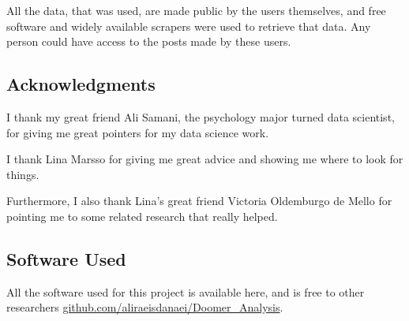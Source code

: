 \documentclass[../report.tex]{subfiles}
\begin{document}
All the data, that was used, are made public by the users themselves, and free software and widely available scrapers were used to retrieve that data. 
Any person could have access to the posts made by these users. 

\subsection{Acknowledgments}
I thank my great friend Ali Samani, the psychology major turned data scientist, for giving me great pointers for my data science work.

I thank Lina Marsso for giving me great advice and showing me where to look for things. 

Furthermore, I also thank Lina's great friend Victoria Oldemburgo de Mello for pointing me to some related research that really helped. 

\subsection{Software Used}
All the software used for this project is available here, and is free to other researchers 
\url{github.com/aliraeisdanaei/Doomer_Analysis}.
\end{document}
